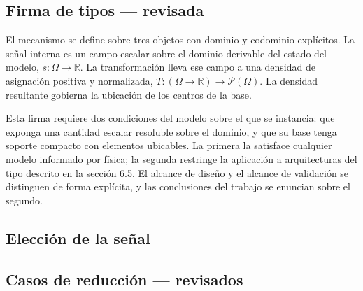 \subsection{Firma de tipos — revisada}

El mecanismo se define sobre tres objetos con dominio y codominio explícitos. La señal interna es un campo escalar sobre el dominio derivable del estado del modelo, $s : \Omega \to \mathbb{R}$. La transformación lleva ese campo a una densidad de asignación positiva y normalizada, $T : (\Omega \to \mathbb{R}) \to \mathcal{P}(\Omega)$. La densidad resultante gobierna la ubicación de los centros de la base.

Esta firma requiere dos condiciones del modelo sobre el que se instancia: que exponga una cantidad escalar resoluble sobre el dominio, y que su base tenga soporte compacto con elementos ubicables. La primera la satisface cualquier modelo informado por física; la segunda restringe la aplicación a arquitecturas del tipo descrito en la sección 6.5. El alcance de diseño y el alcance de validación se distinguen de forma explícita, y las conclusiones del trabajo se enuncian sobre el segundo.


\subsection{Elección de la señal}


\subsection{Casos de reducción — revisados}


